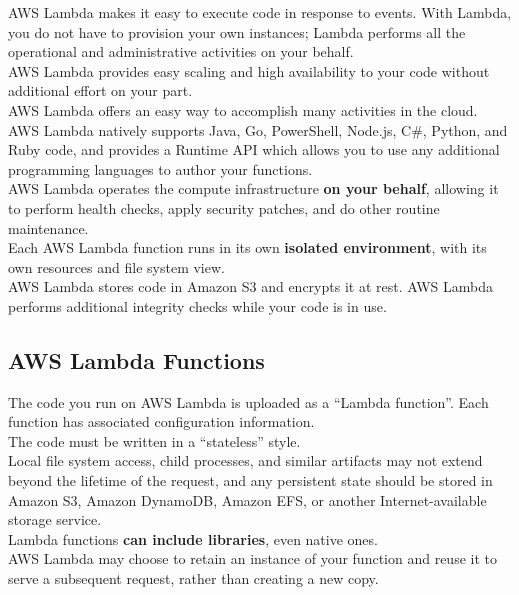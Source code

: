 \documentclass[12pt, letterpaper, twoside]{article}
\begin{document}
AWS Lambda makes it easy to execute code in response to events.
With Lambda, you do not have to provision your own instances; Lambda performs all the operational and administrative activities on your 
behalf.\\
AWS Lambda provides easy scaling and high availability to your code without additional effort on your part.\\

AWS Lambda offers an easy way to accomplish many activities in the cloud.\\
AWS Lambda natively supports Java, Go, PowerShell, Node.js, C\#, Python, and Ruby code, and provides a Runtime API which allows you to use 
any additional programming languages to author your functions.\\

AWS Lambda operates the compute infrastructure \textbf{on your behalf}, allowing it to perform health checks, apply security patches, and 
do other routine maintenance.\\

Each AWS Lambda function runs in its own \textbf{isolated environment}, with its own resources and file system view.\\

AWS Lambda stores code in Amazon S3 and encrypts it at rest. AWS Lambda performs additional integrity checks while your code is in use.\\

\subsection{AWS Lambda Functions}
The code you run on AWS Lambda is uploaded as a “Lambda function”. Each function has associated configuration information.\\
The code must be written in a “stateless” style.\\
Local file system access, child processes, and similar artifacts may not extend beyond the lifetime of the request, and any persistent 
state should be stored in Amazon S3, Amazon DynamoDB, Amazon EFS, or another Internet-available storage service.\\
Lambda functions \textbf{can include libraries}, even native ones.\\

AWS Lambda may choose to retain an instance of your function and reuse it to serve a subsequent request, rather than creating a new copy.\\
\end{document}
